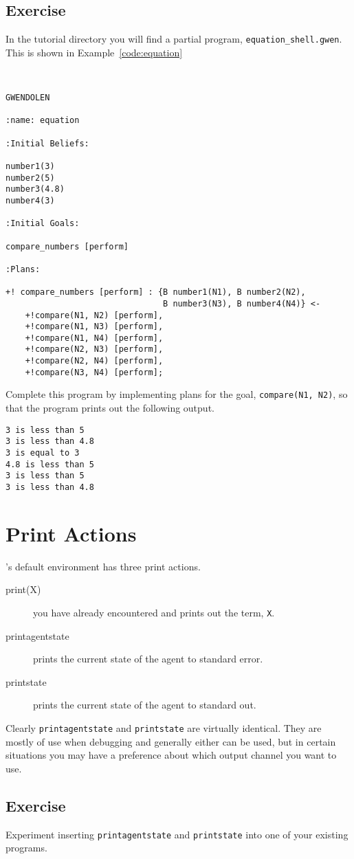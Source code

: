 \subsection{Exercise}
In the tutorial directory you will find a partial program, \texttt{equation\_shell.gwen}.  This is shown in Example~\ref{code:equation}

\begin{ourexample}
\label{code:equation} \quad \\
\begin{lstlisting}[basicstyle=\sffamily,style=easslisting,language=Gwendolen]
GWENDOLEN

:name: equation

:Initial Beliefs:

number1(3)
number2(5)
number3(4.8)
number4(3)

:Initial Goals:

compare_numbers [perform]

:Plans:

+! compare_numbers [perform] : {B number1(N1), B number2(N2), 
                                B number3(N3), B number4(N4)} <-
	+!compare(N1, N2) [perform],
	+!compare(N1, N3) [perform],
	+!compare(N1, N4) [perform],
	+!compare(N2, N3) [perform],
	+!compare(N2, N4) [perform],
	+!compare(N3, N4) [perform];
\end{lstlisting}
\end{ourexample}

Complete this program by implementing plans for the goal, \lstinline{compare(N1, N2)}, so that the program prints out the following output.

\begin{verbatim}
3 is less than 5
3 is less than 4.8
3 is equal to 3
4.8 is less than 5
3 is less than 5
3 is less than 4.8
\end{verbatim}

\section{Print Actions}

\gwendolen's default environment has three print actions.
\begin{description}
\item[print(X)] you have already encountered and prints out the term, \lstinline{X}.
\item[printagentstate] prints the current state of the agent to standard error.
\item[printstate] prints the current state of the agent to standard out.
\end{description}
Clearly \lstinline{printagentstate} and \lstinline{printstate} are virtually identical.  They are mostly of use when debugging and generally either can be used, but in certain situations you may have a preference about which output channel you want to use.

\subsection{Exercise}
Experiment inserting \lstinline{printagentstate} and \lstinline{printstate} into one of your existing programs.

